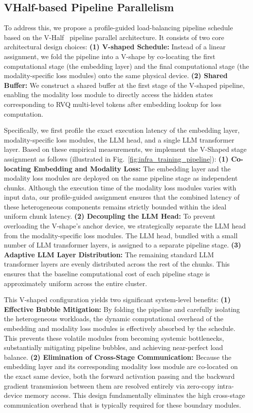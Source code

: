 \documentclass{article}
\begin{document}
\subsection{VHalf-based Pipeline Parallelism}
To address this, we propose a profile-guided load-balancing pipeline schedule based on the V-Half~\cite{qi2024pipelineparallelismcontrollablememory} pipeline parallel architecture. It consists of two core architectural design choices: \textbf{(1) V-shaped Schedule:} Instead of a linear assignment, we fold the pipeline into a V-shape by co-locating the first computational stage (the embedding layer) and the final computational stage (the modality-specific loss modules) onto the same physical device. \textbf{(2) Shared Buffer:} We construct a shared buffer at the first stage of the V-shaped pipeline, enabling the modality loss module to directly access the hidden states corresponding to RVQ multi-level tokens after embedding lookup for loss computation.

Specifically, we first profile the exact execution latency of the embedding layer, modality-specific loss modules, the LLM head, and a single LLM transformer layer. Based on these empirical measurements, we implement the V-Shaped stage assignment as follows (illustrated in Fig.~\ref{fig:infra_training_pipeline}): \textbf{(1) Co-locating Embedding and Modality Loss:} The embedding layer and the modality loss modules are deployed on the same pipeline stage as independent chunks. Although the execution time of the modality loss modules varies with input data, our profile-guided assignment ensures that the combined latency of these heterogeneous components remains strictly bounded within the ideal uniform chunk latency. \textbf{(2) Decoupling the LLM Head:} To prevent overloading the V-shape's anchor device, we strategically separate the LLM head from the modality-specific loss modules. The LLM head, bundled with a small number of LLM transformer layers, is assigned to a separate pipeline stage. \textbf{(3) Adaptive LLM Layer Distribution:} The remaining standard LLM transformer layers are evenly distributed across the rest of the chunks. This ensures that the baseline computational cost of each pipeline stage is approximately uniform across the entire cluster.

This V-shaped configuration yields two significant system-level benefits: \textbf{(1) Effective Bubble Mitigation:} By folding the pipeline and carefully isolating the heterogeneous workloads, the dynamic computational overhead of the embedding and modality loss modules is effectively absorbed by the schedule. This prevents these volatile modules from becoming systemic bottlenecks, substantially mitigating pipeline bubbles, and achieving near-perfect load balance. \textbf{(2) Elimination of Cross-Stage Communication:} Because the embedding layer and its corresponding modality loss module are co-located on the exact same device, both the forward activation passing and the backward gradient transmission between them are resolved entirely via zero-copy intra-device memory access. This design fundamentally eliminates the high cross-stage communication overhead that is typically required for these boundary modules.
\end{document}
